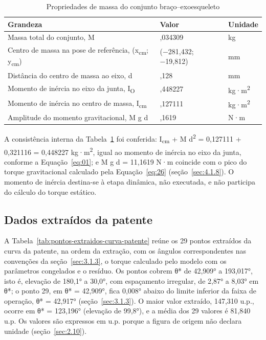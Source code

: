 \begin{table}[!htbp]
\estilotabela{\small}
\caption{Propriedades de massa do conjunto braço–exoesqueleto}\label{tab:propriedades-massa-conjunto-braco}
\begin{tabularx}{\textwidth}{@{}>{\hsize=1.462\hsize\raggedright\arraybackslash}X>{\hsize=0.897\hsize\centering\arraybackslash}X>{\hsize=0.641\hsize\centering\arraybackslash}X@{}}
\toprule
\centering\textbf{Grandeza} & \centering\textbf{Valor} & \centering\textbf{Unidade} \tabularnewline
\midrule
Massa total do conjunto, M & 4,034309 & kg \\
Centro de massa na pose de referência, (x\textsubscript{cm}; y\textsubscript{cm}) & (−281,432; −19,812) & mm \\
Distância do centro de massa ao eixo, d & 282,128 & mm \\
Momento de inércia no eixo da junta, I\textsubscript{O} & 0,448227 & kg·m\textsuperscript{2} \\
Momento de inércia no centro de massa, I\textsubscript{cm} & 0,127111 & kg·m\textsuperscript{2} \\
Amplitude do momento gravitacional, M g d & 11,1619 & N·m \\
\bottomrule
\end{tabularx}
\end{table}

A consistência interna da Tabela~\ref{tab:propriedades-massa-conjunto-braco} foi conferida: I\textsubscript{cm} + M d\textsuperscript{2} = 0,127111 + 0,321116 = 0,448227 kg·m\textsuperscript{2}, igual ao momento de inércia no eixo da junta, conforme a Equação~\eqref{eq:01}; e M g d = 11,1619 N·m coincide com o pico do torque gravitacional calculado pela Equação~\eqref{eq:26} (seção~\ref{sec:4.1.8}). O momento de inércia destina-se à etapa dinâmica, não executada, e não participa do cálculo do torque estático.

\subsection{Dados extraídos da patente}\label{sec:4.1.2}

A Tabela~\ref{tab:pontos-extraidos-curva-patente} reúne os 29 pontos extraídos da curva da patente, na ordem da extração, com os ângulos correspondentes nas convenções da seção~\ref{sec:3.1.3}, o torque calculado pelo modelo com os parâmetros congelados e o resíduo. Os pontos cobrem θ* de 42,909° a 193,017°, isto é, elevação de 180,1° a 30,0°, com espaçamento irregular, de 2,87° a 8,03° em θ*; o ponto 29, em θ* = 42,909°, fica 0,008° abaixo do limite inferior da faixa de operação, θ* = 42,917° (seção~\ref{sec:3.1.3}). O maior valor extraído, 147,310 u.p., ocorre em θ* = 123,196° (elevação de 99,8°), e a média dos 29 valores é 81,840 u.p. Os valores são expressos em u.p. porque a figura de origem não declara unidade (seção~\ref{sec:2.10}).

